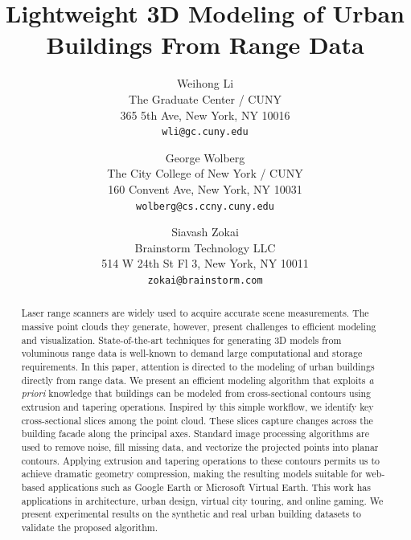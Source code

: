 \documentclass[10pt,twocolumn,letterpaper]{article}
\begin{document}
\title{Lightweight 3D Modeling of Urban Buildings From Range Data}

\author{Weihong Li\\
The Graduate Center / CUNY\\
365 5th Ave, New York, NY 10016\\
{\tt\small wli@gc.cuny.edu}
\and
George Wolberg\\
The City College of New York / CUNY\\
160 Convent Ave, New York, NY 10031\\
{\tt\small wolberg@cs.ccny.cuny.edu}
\and
Siavash Zokai\\
Brainstorm Technology LLC\\
514 W 24th St Fl 3, New York, NY 10011\\
{\tt\small zokai@brainstorm.com}
}

\maketitle

\begin{abstract}
Laser range scanners are widely used to acquire accurate scene measurements.
The massive point clouds they generate, however, present challenges to
efficient modeling and visualization.
State-of-the-art techniques for generating 3D models from voluminous
range data is well-known to demand large computational and storage requirements.
In this paper, attention is directed to the modeling of urban buildings
directly from range data.
We present an efficient modeling algorithm that exploits \emph{a priori}
knowledge that buildings can be modeled from cross-sectional contours
using extrusion and tapering operations.
Inspired by this simple workflow, we identify key cross-sectional slices among
the point cloud.
These slices capture changes across the building facade along the principal axes.
Standard image processing algorithms are used to remove noise, fill missing
data, and vectorize the projected points into planar contours.
Applying extrusion and tapering operations to these contours
permits us to achieve dramatic geometry compression, making the resulting
models suitable for web-based applications such as Google Earth
or Microsoft Virtual Earth.
This work has applications in architecture, urban design, virtual city
touring, and online gaming.
We present experimental results on the synthetic and real urban building
datasets to validate the proposed algorithm.
\end{abstract}
\end{document}
